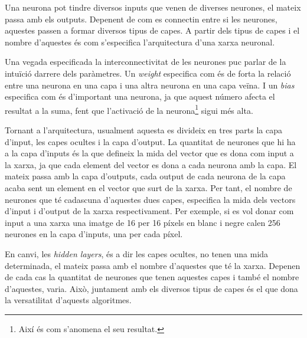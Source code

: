 Una neurona pot tindre diversos inputs que venen de diverses neurones, el mateix passa amb els outputs. Depenent de com es connectin entre si les neurones, aquestes passen a formar diversos tipus de capes. A partir dels tipus de capes i el nombre d'aquestes és com s'especifica l'arquitectura d'una xarxa neuronal.

Una vegada especificada la interconnectivitat de les neurones puc parlar de la intuïció darrere dels paràmetres. Un \textit{weight} especifica com és de forta la relació entre una neurona en una capa i una altra neurona en una capa veïna. I un \textit{bias} especifica com és d'important una neurona, ja que aquest número afecta el resultat a la suma, fent que l'activació de la neurona\footnote{Així és com s'anomena el seu resultat.} sigui més alta.

Tornant a l'arquitectura, usualment aquesta es divideix en tres parts la capa d'input, les capes ocultes i la capa d'output. La quantitat de neurones que hi ha a la capa d'inputs és la que defineix la mida del vector que es dona com input a la xarxa, ja que cada element del vector es dona a cada neurona amb la capa. El mateix passa amb la capa d'outputs, cada output de cada neurona de la capa acaba sent un element en el vector que surt de la xarxa. Per tant, el nombre de neurones que té cadascuna d'aquestes dues capes, especifica la mida dels vectors d'input i d'output de la xarxa respectivament. Per exemple, si es vol donar com input a una xarxa una imatge de 16 per 16 píxels en blanc i negre calen 256 neurones en la capa d'inputs, una per cada píxel.

En canvi, les \textit{hidden layers}, és a dir les capes ocultes, no tenen una mida determinada, el mateix passa amb el nombre d'aquestes que té la xarxa. Depenen de cada cas la quantitat de neurones que tenen aquestes capes i també el nombre d'aquestes, varia. Això, juntament amb els diversos tipus de capes és el que dona la versatilitat d'aquests algoritmes.


